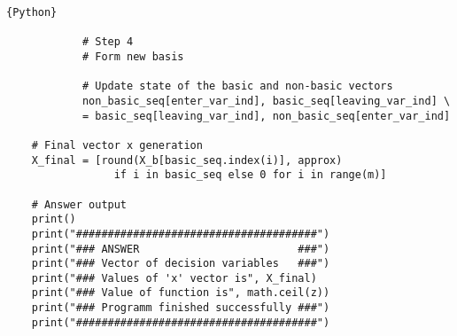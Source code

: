 \documentclass[12pt, legalpaper]{exam}
\begin{document}
\begin{lstlisting}{Python}
    
            # Step 4
            # Form new basis
    
            # Update state of the basic and non-basic vectors
            non_basic_seq[enter_var_ind], basic_seq[leaving_var_ind] \
            = basic_seq[leaving_var_ind], non_basic_seq[enter_var_ind]
    
    # Final vector x generation
    X_final = [round(X_b[basic_seq.index(i)], approx)
                 if i in basic_seq else 0 for i in range(m)]
    
    # Answer output
    print()
    print("######################################")
    print("### ANSWER                         ###")
    print("### Vector of decision variables   ###")
    print("### Values of 'x' vector is", X_final)
    print("### Value of function is", math.ceil(z))
    print("### Programm finished successfully ###")
    print("######################################")
    
\end{lstlisting}
\end{document}
